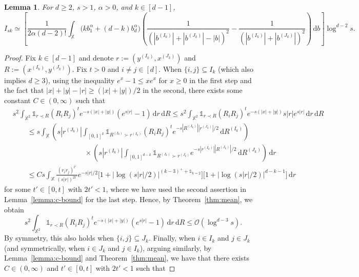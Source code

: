 \documentclass[11pt,reqno]{amsart}
\numberwithin{equation}{section}
\newtheorem{lemma}[theorem]{Lemma}
\theoremstyle{definition}
\newcommand{\XX}{\mathbb{X}}
\newcommand{\diff}{{\,\mathrm d}}
\begin{document}
\begin{lemma} For $d \ge 2$, $s>1$, $\alpha>0$,  and $k \in [d-1]$,
	$$
	I_{sk} \simeq \left[\frac{1}{2\alpha(d-2)!} \int_{\XX } \Big(k b_1^{\alpha} + (d-k)b_{d}^{\alpha}\Big) \left(\frac{1}{(|b^{(I_k)}| + |b^{(J_k)}|-|b|)^{2}}  - \frac{1}{(|b^{(I_k)}| + |b^{(J_k)}|)^{2}}\right) \diff b \right] \log^{d-2} s.
	$$
\end{lemma}
\begin{proof}
	Fix $k \in [d-1]$ and denote $r:=(y^{(I_k)},x^{(J_k)})$ and $R:=(x^{(I_k)},y^{(J_k)})$. 
	Fix $t>0$ and $i\not=j \in [d]$. When $\{i,j\} \subseteq I_k$ (which also implies $d \ge 3$), using the inequality $e^x - 1 \le xe^{x}$ for $x \ge 0$ in the first step and the fact that $|x|+|y|-|r| \ge (|x|+|y|)/2$ in the second, there exists some constant $C \in (0,\infty)$ such that
	\begin{align*}
		&s^2 \int_{\XX^2} \mathds{1}_{r \prec R} (R_i R_j)^{t}  e^{-s(|x|+|y|)} (e^{s|r|}-1) \diff r \diff R
		\le s^2 \int_{\XX^2} \mathds{1}_{r \prec R} (R_iR_j)^{t}  e^{-s(|x|+|y|)} s|r| e^{s|r|} \diff r \diff R \nonumber\\
		&\qquad \le s \int_\XX \left(s|r^{(J_k)}| \int_{[0,1]^{k}} \mathds{1}_{R^{(I_k)} \succ r^{(I_k)}} (R_iR_j)^{t} e^{-s|R^{(I_k)}||r^{(J_k)}|/2} \diff R^{(I_k)}\right)  \nonumber\\
		& \qquad\qquad\qquad\qquad\qquad \times \left(s|r^{(I_k)}| \int_{[0,1]^{d-k}} \mathds{1}_{R^{(J_k)} \succ r^{(J_k)}} e^{-s|r^{(I_k)}||R^{(J_k)}|/2} \diff R^{(J_k)}\right) \diff r\nonumber\\
		& \qquad \le C s \int_\XX \frac{(r_ir_j)^{t'}}{(s|r|)^{2t'}} e^{-s|r|/2} \Big[1+\big|\log(s|r|/2)\big|^{(k-3)^+ +\mathds{1}_{k=2}}\Big] \Big[1+\big|\log(s|r|/2)\big|^{d-k-1}\Big]\diff r
	\end{align*}
	for some $t' \in [0,t]$ with $2t'<1$, where we have used the second assertion in Lemma~\ref{lemma:c-bound} for the last step. Hence, by Theorem~\ref{thm:mean}, we obtain
	\begin{equation}\label{eq:secik}
		s^2 \int_{\XX^2} \mathds{1}_{r \prec R} (R_i R_j)^{t}  e^{-s(|x|+|y|)} (e^{s|r|}-1) \diff r \diff R \le \mathcal{O}(\log^{d-3} s).
	\end{equation}
	By symmetry, this also holds when $\{i,j\} \subseteq J_k$. Finally, when $i \in I_k$ and $j \in J_k$ (and symmetrically, when $i \in J_k$ and $j \in I_k$), arguing similarly, by Lemma~\ref{lemma:c-bound} and Theorem~\ref{thm:mean}, we have that there exists $C \in (0,\infty)$ and $t' \in [0,t]$ with $2t'<1$ such that

\end{proof}
\end{document}

